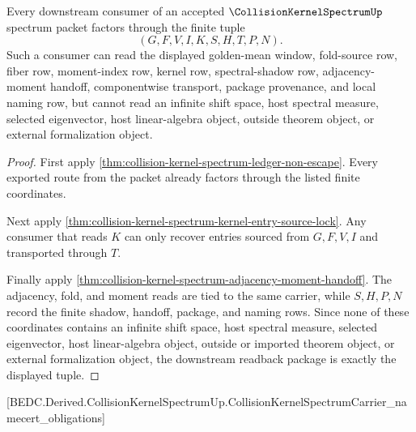 \begin{theorem}
\label{thm:collision-kernel-spectrum-downstream-readback-package}
Every downstream consumer of an accepted $\CollisionKernelSpectrumUp$ spectrum packet factors through the finite tuple
$$
(G,F,V,I,K,S,H,T,P,N).
$$
Such a consumer can read the displayed golden-mean window, fold-source row, fiber row, moment-index row, kernel row, spectral-shadow row, adjacency-moment handoff, componentwise transport, package provenance, and local naming row, but cannot read an infinite shift space, host spectral measure, selected eigenvector, host linear-algebra object, outside theorem object, or external formalization object.
\end{theorem}
\begin{proof}
First apply \autoref{thm:collision-kernel-spectrum-ledger-non-escape}. Every exported route from the packet already factors through the listed finite coordinates.

Next apply \autoref{thm:collision-kernel-spectrum-kernel-entry-source-lock}. Any consumer that reads $K$ can only recover entries sourced from $G,F,V,I$ and transported through $T$.

Finally apply \autoref{thm:collision-kernel-spectrum-adjacency-moment-handoff}. The adjacency, fold, and moment reads are tied to the same carrier, while $S,H,P,N$ record the finite shadow, handoff, package, and naming rows. Since none of these coordinates contains an infinite shift space, host spectral measure, selected eigenvector, host linear-algebra object, outside or imported theorem object, or external formalization object, the downstream readback package is exactly the displayed tuple.
\end{proof}

[BEDC.Derived.CollisionKernelSpectrumUp.CollisionKernelSpectrumCarrier\_namecert\_obligations]

